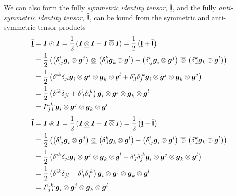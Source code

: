 We can also form the fully \emph{symmetric identity tensor},
$  \overline{\underline{\boldsymbol{\mathsf{ I }}}}  $, and the fully \emph{anti-symmetric identity tensor},
$  \tilde{\boldsymbol{\mathsf{ I }}}  $, can be found from the symmetric and
anti-symmetric tensor products \ie
\begin{equation}
  \begin{aligned}
      \overline{\underline{\boldsymbol{\mathsf{ I }}}}  &= \boldsymbol{\mathit{I}} \odot \boldsymbol{\mathit{I}} =\dfrac{1}{2}\left(  \boldsymbol{\mathit{I}} \, \underline{\otimes} \, \boldsymbol{\mathit{I}} + \boldsymbol{\mathit{I}} \, \overline{\otimes} \, \boldsymbol{\mathit{I}}  \right)=\dfrac{1}{2}\left(   \underline{\boldsymbol{\mathsf{ I }}}  +  \overline{\boldsymbol{\mathsf{ I }}}   \right)\\
    &=\dfrac{1}{2}\left(  \left(  \delta^{i}_{.j}  \boldsymbol{g}_{i} \otimes \boldsymbol{g}^{j}  \right) \, \underline{\otimes} \, \left(  \delta^{k}_{.l}  \boldsymbol{g}_{k} \otimes \boldsymbol{g}^{l}  \right) + \left(  \delta^{i}_{.j}  \boldsymbol{g}_{i} \otimes \boldsymbol{g}^{j}  \right) \, \overline{\otimes} \, \left(  \delta^{k}_{.l}  \boldsymbol{g}_{k} \otimes \boldsymbol{g}^{l}  \right)  \right)\\
    &=\dfrac{1}{2}\left(  \delta^{{i}{k}}  \delta_{{j}{l}}  \boldsymbol{g}_{i} \otimes \boldsymbol{g}^{j} \otimes \boldsymbol{g}_{k} \otimes \boldsymbol{g}^{l} + \delta^{i}_{.l}  \delta^{.k}_{j}  \boldsymbol{g}_{i} \otimes \boldsymbol{g}^{j} \otimes \boldsymbol{g}_{k} \otimes \boldsymbol{g}^{j}  \right)\\
    &=\dfrac{1}{2}\left(  \delta^{{i}{k}}  \delta_{{j}{l}} + \delta^{i}_{.l}  \delta^{.k}_{j}  \right) \boldsymbol{g}_{i} \otimes \boldsymbol{g}^{j} \otimes \boldsymbol{g}_{k} \otimes \boldsymbol{g}^{l} \\
    &=I^{i.k.}_{.j.l} \boldsymbol{g}_{i} \otimes \boldsymbol{g}^{j} \otimes \boldsymbol{g}_{k} \otimes \boldsymbol{g}^{l} 
  \end{aligned}
\end{equation}
\begin{equation}
  \begin{aligned}
      \tilde{\boldsymbol{\mathsf{ I }}}  &= \boldsymbol{\mathit{I}} \circledast \boldsymbol{\mathit{I}} =\dfrac{1}{2}\left(  \boldsymbol{\mathit{I}} \, \underline{\otimes} \, \boldsymbol{\mathit{I}} - \boldsymbol{\mathit{I}} \, \overline{\otimes} \, \boldsymbol{\mathit{I}}  \right)=\dfrac{1}{2}\left(   \underline{\boldsymbol{\mathsf{ I }}}  -  \overline{\boldsymbol{\mathsf{ I }}}   \right)\\
    &=\dfrac{1}{2}\left(  \left(  \delta^{i}_{.j}  \boldsymbol{g}_{i} \otimes \boldsymbol{g}^{j}  \right) \, \underline{\otimes} \, \left(  \delta^{k}_{.l}  \boldsymbol{g}_{k} \otimes \boldsymbol{g}^{l}  \right) - \left(  \delta^{i}_{.j}  \boldsymbol{g}_{i} \otimes \boldsymbol{g}^{i}  \right) \, \overline{\otimes} \, \left(  \delta^{k}_{.l}  \boldsymbol{g}_{k} \otimes \boldsymbol{g}^{l}  \right)  \right)\\
    &=\dfrac{1}{2}\left(  \delta^{{i}{k}}  \delta_{{j}{l}}  \boldsymbol{g}_{i} \otimes \boldsymbol{g}^{j} \otimes \boldsymbol{g}_{k} \otimes \boldsymbol{g}^{l} - \delta^{i}_{.l}  \delta^{.k}_{j}  \boldsymbol{g}_{i} \otimes \boldsymbol{g}^{j} \otimes \boldsymbol{g}_{k} \otimes \boldsymbol{g}^{l}  \right)\\
    &=\dfrac{1}{2}\left(  \delta^{{i}{k}}  \delta_{{j}{l}} - \delta^{i}_{.l}  \delta^{.k}_{j}  \right) \boldsymbol{g}_{i} \otimes \boldsymbol{g}^{j} \otimes \boldsymbol{g}_{k} \otimes \boldsymbol{g}^{l} \\
    &=I^{i.k.}_{.j.l} \boldsymbol{g}_{i} \otimes \boldsymbol{g}^{j} \otimes \boldsymbol{g}_{k} \otimes \boldsymbol{g}^{l} 
  \end{aligned}
\end{equation}

